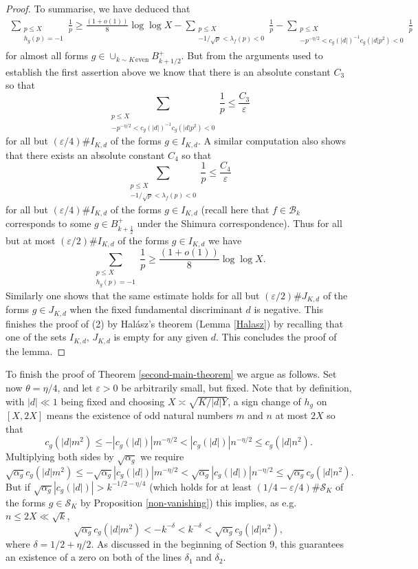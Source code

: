 \documentclass[a4paper,10pt,twoside]{amsart}
\theoremstyle{definition}
\numberwithin{equation}{section}
\newcommand\eps{\varepsilon}
\renewcommand\:{\colon}
\begin{document}
\begin{proof}
To summarise, we have deduced that 
\begin{align*}
\sum_{\substack{p\leq X\\
h_g(p)=-1}}\frac1p\geq\frac{(1+o(1))}{8}\log\log X-\sum_{\substack{p\leq X\\
-1/\sqrt p<\lambda_f(p)<0}}\frac1p-\sum_{\substack{p\leq X\\
-p^{-\eta/2}<c_g(|d|)^{-1}c_g(|d|p^2)<0}}\frac 1p
\end{align*}
for almost all forms $g\in\cup_{k\sim K\,\text{even}}B_{k+1/2}^+$. But from the arguments used to establish the first assertion above we know that there is an absolute constant $C_3$ so that
\[ 
\sum_{\substack{p\leq X\\
-p^{-\eta/2}<c_g(|d|)^{-1}c_g(|d|p^2)<0}}\frac 1p\leq\frac{C_3}{\varepsilon}\]
for all but $(\varepsilon/4)\# I_{K,d}$ of the forms $g\in I_{K,d}$. A similar computation also shows that there exists an absolute constant $C_4$ so that
\[ 
\sum_{\substack{p\leq X\\
-1/\sqrt p<\lambda_f(p)<0}}\frac1p\leq\frac{C_4}{\varepsilon}
\]
for all but $(\varepsilon/4)\# I_{K,d}$ of the forms $g\in I_{K,d}$ (recall here that $f\in\mathcal B_k$ corresponds to some $g\in B_{k+\frac12}^+$ under the Shimura correspondence). Thus for all but at most $(\eps/2)\#I_{K,d}$ of the forms $g\in I_{K,d}$ we have
\[
\sum_{\substack{p\leq X\\
h_g(p)=-1}}\frac1p\geq\frac{(1+o(1))}{8}\log\log X. 
\]
Similarly one shows that the same estimate holds for all but $(\varepsilon/2)\# J_{K,d}$ of the forms $g\in J_{K,d}$ when the fixed fundamental discriminant $d$ is negative. This finishes the proof of (2) by Hal\'asz's theorem (Lemma \ref{Halasz}) by recalling that one of the sets $I_{K,d},\,J_{K,d}$ is empty for any given $d$. This concludes the proof of the lemma. 

\end{proof}

\noindent To finish the proof of Theorem \ref{second-main-theorem} we argue as follows. Set now $\theta=\eta/4$, and let $\eps>0$ be arbitrarily small, but fixed.  Note that by definition, with $|d|\ll 1$ being fixed and choosing $X\asymp\sqrt{K/|d|Y}$, a sign change of $h_g$ on $[X,2X]$ means the existence of odd natural numbers $m$ and $n$ at most $2X$ so that
\[ 
c_g(|d|m^2)\leq-|c_g(|d|)|m^{-\eta/2}<|c_g(|d|)|n^{-\eta/2}\leq c_g(|d|n^2).
\]
Multiplying both sides by $\sqrt{\alpha_g}$ we require 
\[ 
\sqrt{\alpha_g}c_g(|d|m^2)\leq-\sqrt{\alpha_g}|c_g(|d|)|m^{-\eta/2}<\sqrt{\alpha_g}|c_g(|d|)|n^{-\eta/2}\leq \sqrt{\alpha_g}c_g(|d|n^2).
\]
But if $\sqrt{\alpha_g}|c_g(|d|)|> k^{-1/2-\eta/4}$ (which holds for at least $(1/4-\eps/4)\#\mathcal S_K$ of the forms $g\in\mathcal S_K$ by Proposition \ref{non-vanishing}) this implies, as e.g. $n\leq 2X\ll \sqrt k$, 
\[
\sqrt{\alpha_g}c_g(|d|m^2)<-k^{-\delta}<k^{-\delta}<\sqrt{\alpha_g}c_g(|d|n^2),
\]
where $\delta=1/2+\eta/2$. As discussed in the beginning of Section 9, this guarantees an existence of a zero on both of the lines $\delta_1$ and $\delta_2$.
\end{document}
